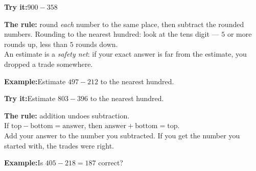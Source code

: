 \documentclass[12pt]{article}
\begin{document}
\begin{tryitbox}
\textbf{Try it:}\quad $900 - 358$\\[2pt]
\end{tryitbox}


\begin{formulabox}
\textbf{The rule:} round \emph{each} number to the same place, then subtract the
rounded numbers. Rounding to the nearest hundred: look at the tens digit ---
$5$ or more rounds up, less than $5$ rounds down.\\[3pt]
An estimate is a \emph{safety net}: if your exact answer is far from the
estimate, you dropped a trade somewhere.
\end{formulabox}

\begin{examplebox}
\textbf{Example:}\quad Estimate $497 - 212$ to the nearest hundred.
\end{examplebox}

\begin{tryitbox}
\textbf{Try it:}\quad Estimate $803 - 396$ to the nearest hundred.\\[2pt]
\end{tryitbox}


\begin{formulabox}
\textbf{The rule:} addition undoes subtraction.\\[3pt]
If $\text{top} - \text{bottom} = \text{answer}$, then
$\text{answer} + \text{bottom} = \text{top}$.\\[3pt]
Add your answer to the number you subtracted. If you get the number you started
with, the trades were right.
\end{formulabox}

\begin{examplebox}
\textbf{Example:}\quad Is $405 - 218 = 187$ correct?
\end{examplebox}
\end{document}
